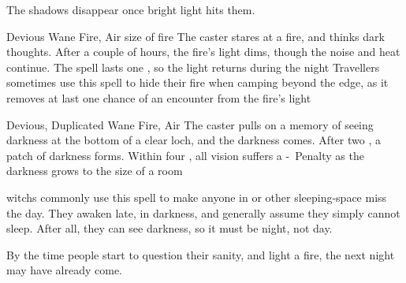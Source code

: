 \begin{multicols}{2}
{  The shadows disappear once bright light hits them.}

  {Devious}%
  {Wane}%
  {Fire, Air}%
  {size of fire}%
  {The caster stares at a fire, and thinks dark thoughts.
  After a couple of hours, the fire's light dims, though the noise and heat continue.
  The spell lasts one \showOnset, so the light returns during the night}%
  {Travellers sometimes use this spell to hide their fire when camping beyond the \gls{edge}, as it removes at last one chance of an encounter from the fire's light}



  {Devious, Duplicated}%
  {Wane}%
  {Fire, Air}%
  {}%
  {The caster pulls on a memory of seeing darkness at the bottom of a clear loch, and the darkness comes.
  After two , a patch of darkness forms.
  Within four , all vision suffers a -~Penalty as the darkness grows to the size of a room}%
  {
  \Glspl{witch} commonly use this spell to make anyone in  or other sleeping-space miss the day.
  They awaken late, in darkness, and generally assume they simply cannot sleep.
  After all, they can see darkness, so it must be night, not day.

  By the time people start to question their sanity, and light a fire, the next night may have already come.
  }


\iftoggle{intro}{}{

  \subsection{Force}
  \label{forceSpells}

  \showSpells{Force1}

  \showSpells{Force1}

  \spell{Close the Gate}%
    {}%
    {Wane}%
    {Earth, Fire}%
    {8 + Gateway's level}%
    {The caster shouts `close the gate', at a magical gateway, and the \gls{spell} collapses}%
    {Anyone inside the gateway is spat out like a rotten lump of soup}

  \spell{Friendly Bolt}%
    {Duplicated}%
    {Wane}%
    {Earth, Fire}%
    {\gls{weight} carried}%
    {The caster shouts `let's go', and two targets gain a +\arabic{spellPlusOne}~Bonus to running}%
    {They feel suddenly lighter, as if being carried.
    However, this spell does not help with carrying heavy items.}

}
\end{multicols}
